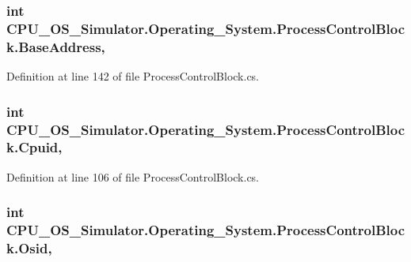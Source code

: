 \subsubsection[{Base\+Address}]{\setlength{\rightskip}{0pt plus 5cm}int C\+P\+U\+\_\+\+O\+S\+\_\+\+Simulator.\+Operating\+\_\+\+System.\+Process\+Control\+Block.\+Base\+Address\hspace{0.3cm}{\ttfamily [get]}, {\ttfamily [set]}}\label{class_c_p_u___o_s___simulator_1_1_operating___system_1_1_process_control_block_a20803d3e907266a7b7920e01e5574a99}


Definition at line 142 of file Process\+Control\+Block.\+cs.

\hypertarget{class_c_p_u___o_s___simulator_1_1_operating___system_1_1_process_control_block_a45dd5ef24fa73b58f4a335168fd50663}{}
\subsubsection[{Cpuid}]{\setlength{\rightskip}{0pt plus 5cm}int C\+P\+U\+\_\+\+O\+S\+\_\+\+Simulator.\+Operating\+\_\+\+System.\+Process\+Control\+Block.\+Cpuid\hspace{0.3cm}{\ttfamily [get]}, {\ttfamily [set]}}\label{class_c_p_u___o_s___simulator_1_1_operating___system_1_1_process_control_block_a45dd5ef24fa73b58f4a335168fd50663}


Definition at line 106 of file Process\+Control\+Block.\+cs.

\hypertarget{class_c_p_u___o_s___simulator_1_1_operating___system_1_1_process_control_block_a4543f27a0bafc028e2a76e7ff301d48f}{}
\subsubsection[{Osid}]{\setlength{\rightskip}{0pt plus 5cm}int C\+P\+U\+\_\+\+O\+S\+\_\+\+Simulator.\+Operating\+\_\+\+System.\+Process\+Control\+Block.\+Osid\hspace{0.3cm}{\ttfamily [get]}, {\ttfamily [set]}}\label{class_c_p_u___o_s___simulator_1_1_operating___system_1_1_process_control_block_a4543f27a0bafc028e2a76e7ff301d48f}


